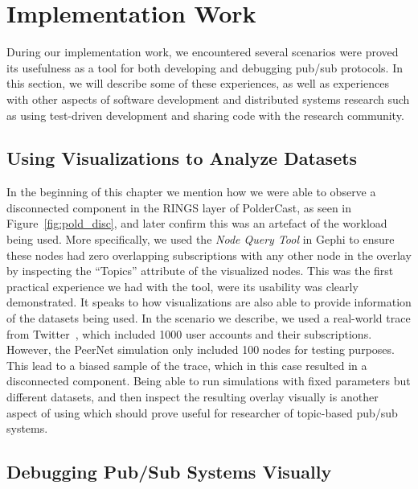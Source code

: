 \section{Implementation Work}

During our implementation work, we encountered several scenarios were
\demo proved its usefulness as a tool for both developing and debugging
pub/sub protocols. In this section, we will describe some of these
experiences, as well as experiences with other aspects of software
development and distributed systems research such as using test-driven
development and sharing code with the research community.

\subsection{Using Visualizations to Analyze Datasets}

In the beginning of this chapter we mention how we were able to observe a
disconnected component in the RINGS layer of PolderCast, as seen in
Figure~\ref{fig:pold_disc}, and later confirm this was an artefact of
the workload being used. More specifically, we used the \emph{Node Query
    Tool} in Gephi to ensure these nodes had zero overlapping
subscriptions with any other node in the overlay by inspecting the
``Topics'' attribute of the visualized nodes. This was the first
practical experience we had with the tool, were its usability was clearly
demonstrated. It speaks to how visualizations are also able to provide
information of the datasets being used. In the scenario we describe, we
used a real-world trace from Twitter~\cite{Kwak10www}, which included
1000 user accounts and their subscriptions. However, the PeerNet
simulation only included 100 nodes for testing purposes. This lead to a
biased sample of the trace, which in this case resulted in a
disconnected component. Being able to run simulations with fixed
parameters but different datasets, and then inspect the resulting
overlay visually is another aspect of using \demo which should prove
useful for researcher of topic-based pub/sub systems.

\subsection{Debugging Pub/Sub Systems Visually}

